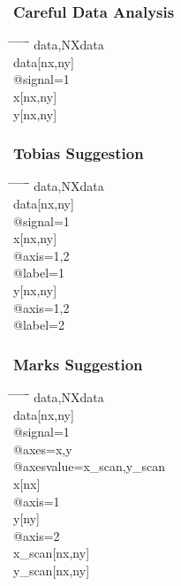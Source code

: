 \documentclass{beamer}
\begin{document}
\begin{frame} \frametitle{Careful Data Analysis}
\begin{tabbing}
\hspace*{1cm} \= \hspace*{1cm} \= \hspace*{1cm} \= \hspace*{1cm} \= \hspace*{1cm} \= \hspace*{1cm}\= \kill
\>data,NXdata\\
\> \>data[nx,ny]\\
\> \> \>@signal=1 \\
\> \>x[nx,ny]\\
\> \>y[nx,ny]\\
\end{tabbing}
\end{frame}

\begin{frame} \frametitle{Tobias Suggestion}
\begin{tabbing}
\hspace*{1cm} \= \hspace*{1cm} \= \hspace*{1cm} \= \hspace*{1cm} \= \hspace*{1cm} \= \hspace*{1cm}\= \kill
\>data,NXdata\\
\> \>data[nx,ny]\\
\> \> \>@signal=1 \\
\> \>x[nx,ny]\\
\> \> \>@axis=1,2\\
\> \> \>@label=1\\
\> \>y[nx,ny]\\
\> \> \>@axis=1,2\\
\> \> \>@label=2\\
\end{tabbing}
\end{frame}

\begin{frame} \frametitle{Marks Suggestion}
\begin{tabbing}
\hspace*{1cm} \= \hspace*{1cm} \= \hspace*{1cm} \= \hspace*{1cm} \= \hspace*{1cm} \= \hspace*{1cm}\= \kill
\>data,NXdata\\
\> \>data[nx,ny]\\
\> \> \>@signal=1 \\
\> \> \>@axes=x,y \\
\> \> \>@axesvalue=x\_scan,y\_scan \\
\> \>x[nx]\\
\> \> \>@axis=1\\
\> \>y[ny]\\
\> \> \>@axis=2\\
\> \>x\_scan[nx,ny]\\
\> \>y\_scan[nx,ny]\\
\end{tabbing}
\end{frame}
\end{document}
